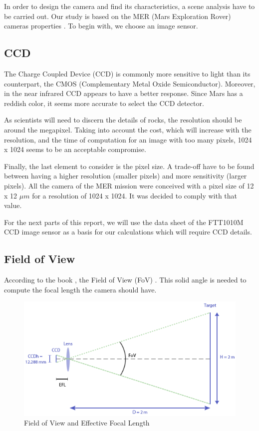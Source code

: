 In order to design the camera and find its characteristics, a scene analysis have to be carried out. Our study is based on the MER (Mars Exploration Rover) cameras properties \cite{merengineeringcameras}.
To begin with, we choose an image sensor. 

\subsection{CCD}
The Charge Coupled Device (CCD) is commonly more sensitive to light than its counterpart, the CMOS (Complementary Metal Oxide Semiconductor). Moreover, in the near infrared CCD appears to have a better response. Since Mars has a reddish color, it seems more accurate to select the CCD detector.

As scientists will need to discern the details of rocks, the resolution should be around the megapixel. Taking into account the cost, which will increase with the resolution, and the time of computation for an image with too many pixels, 1024 x 1024 seems to be an acceptable compromise.

Finally, the last element to consider is the pixel size. A trade-off have to be found between having a higher resolution (smaller pixels) and more sensitivity (larger pixels). All the camera of the MER mission were conceived with a pixel size of 12 x 12 $\mu m$ for a resolution of 1024 x 1024. It was decided to comply with that value.

For the next parts of this report, we will use the data sheet of the FTT1010M CCD image sensor as a basis for our calculations which will require CCD details.

\subsection{Field of View}
According to the book \cite{book}, the Field of View (FoV) . This solid angle is needed to compute the focal length the camera should have.

\begin{figure}[h]
  \centering
  \includegraphics[scale=0.7]{fig/FOV.png}
  \caption{Field of View and Effective Focal Length}
  \label{fig:FOV}
\end{figure}

